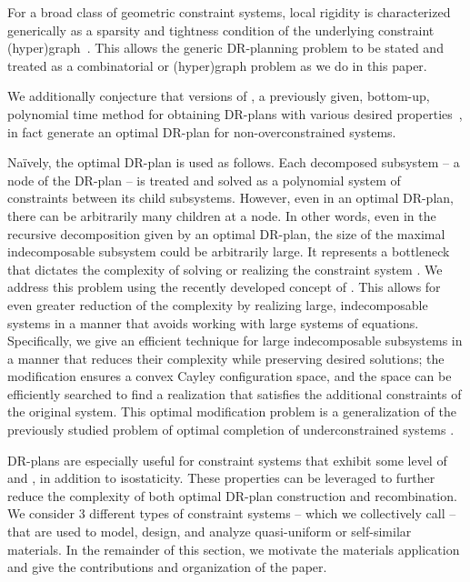 For a broad class of geometric constraint systems, local rigidity is characterized generically as a sparsity and tightness condition of the underlying constraint (hyper)graph~\cite{laman1970graphs,streinu2009sparse,tay1976rigidity,white1987algebraic}. This allows the generic DR-planning problem to be stated and treated as a combinatorial or (hyper)graph problem as we do in this paper.

We additionally conjecture that versions of \frontier, a previously given, bottom-up, polynomial time method for obtaining DR-plans with various desired properties~\cite{hoffman2001decompositionI, hoffman2001decompositionII,lomonosov2004graph,sitharam2005combinatorial}, in fact generate an optimal DR-plan for non-overconstrained systems.


Na{\"i}vely, the optimal DR-plan is used as follows. Each decomposed subsystem -- a node of the DR-plan -- is treated and solved as a polynomial system of constraints between its child subsystems. However, even in an optimal DR-plan, there can be arbitrarily many children at a node. In other words, even in the recursive decomposition given by an optimal DR-plan, the  size of the maximal indecomposable subsystem could be arbitrarily large.  It represents a bottleneck that dictates the complexity of solving or realizing the constraint system \cite{sitharam2010optimized,sitharam2006well,sitharam2010reconciling}.  We address this problem using the recently developed concept of  \cite{sitharam2010convex,sitharam2011cayleyI,sitharam2011cayleyII,sitharam2014beast,sitharam2013caymos,wang2014cayley}. This allows for even greater reduction of the complexity by realizing large, indecomposable systems in a manner that avoids working with large systems of equations.
Specifically, we give an efficient technique for  large indecomposable subsystems in a manner that reduces their complexity while preserving desired solutions; the modification ensures a convex Cayley configuration space, and the space can be efficiently searched to find a realization that satisfies the additional constraints of the original system.
This optimal modification  problem is a generalization of the previously studied problem of optimal completion of underconstrained systems \cite{sitharam2005combinatorial,joan-arinyo2003transforming}.

DR-plans are especially useful for constraint systems that exhibit some level of  and , in addition to isostaticity.  These properties can be leveraged to further reduce the complexity of both optimal DR-plan construction and recombination.
We consider 3 different types of constraint systems -- which we collectively call  -- that are used to model, design, and analyze quasi-uniform or self-similar materials.
In the remainder of this section, we motivate the materials application and give the contributions and organization of the paper.

